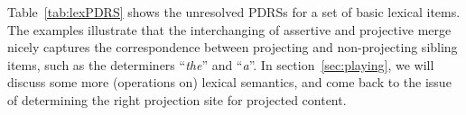 Table~\ref{tab:lexPDRS} shows the unresolved PDRSs for a set of basic
lexical items. The examples illustrate that the interchanging of assertive
and projective merge nicely captures the correspondence between projecting
and non-projecting sibling items, such as the determiners ``\textit{the}''
and ``\textit{a}''.
In section~\ref{sec:playing}, we will discuss some more (operations on)
lexical semantics, and come back to the issue of determining the right
projection site for projected content.



